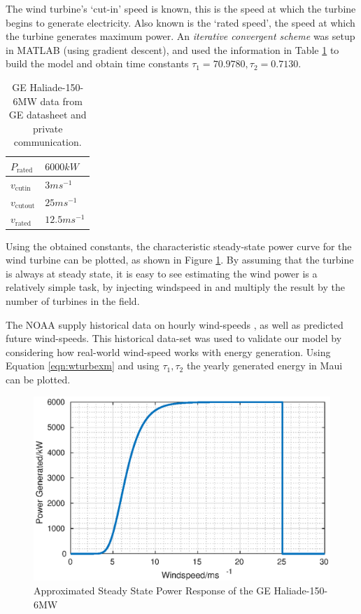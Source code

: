 The wind turbine's `cut-in' speed is known, this is the speed at which the turbine begins to generate electricity.
Also known is the `rated speed', the speed at which the turbine generates maximum power.
An \emph{iterative convergent scheme} was setup in MATLAB (using gradient descent), and used the information in Table \ref{tbl:haliade} to build the model and obtain time constants $\tau_1 = 70.9780,\tau_2 = 0.7130$.
%
\begin{table}[bh]
        \centering
        \begin{tabular}{||l | l||}
                \hline
                $P_{\text{rated}}$ & $6000kW$\\
                \hline
                $v_{\text{cutin}}$ & $3ms^{-1}$\\
                \hline
                $v_{\text{cutout}}$ & $25ms^{-1}$\\
                \hline
                $v_{\text{rated}}$ & $12.5ms^{-1}$\\
                \hline
        \end{tabular}
        \caption{GE Haliade-150-6MW data from GE datasheet and private communication. \cite{power:wturbdata}} \label{tbl:haliade}
\end{table}

Using the obtained constants, the characteristic steady-state power curve for the wind turbine can be plotted, as shown in Figure \ref{fig:wturb}.
By assuming that the turbine is always at steady state, it is easy to see estimating the wind power is a relatively simple task, by injecting windspeed in and multiply the result by the number of turbines in the field.

The NOAA supply historical data on hourly wind-speeds \cite{power:NOAA}, as well as predicted future wind-speeds.
This historical data-set was used to validate our model by considering how real-world wind-speed works with energy generation.
Using Equation \ref{eqn:wturbexm} and using $\tau_1, \tau_2$ the yearly generated energy in Maui can be plotted.
           \begin{figure}[bht]
                   \centering
                   \includegraphics[scale=0.6]{./images/turbine.eps}
                   \caption{Approximated Steady State Power Response of the GE Haliade-150-6MW} \label{fig:wturb}
           \end{figure}

